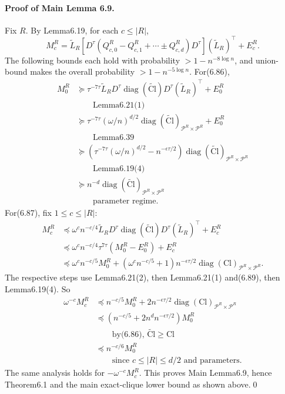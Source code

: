 \paragraph{Proof of Main Lemma 6.9.} Fix $R$. By Lemma6.19, for each $c\le|R|$,
\[M_c^R=\widetilde L_R[D^\tau(Q_{c,0}^R-Q_{c,1}^R+\cdots\pm Q_{c,d}^R)D^\tau](\widetilde L_R)^\top+E_c^R.\tag{6.89}\]
The following bounds each hold with probability $>1-n^{-8\log n}$, and union-bound makes the overall probability $>1-n^{-5\log n}$.
For(6.86),
\begin{align*}M_0^R&\succeq\tau^{-7\tau}\widetilde L_RD^\tau\operatorname{diag}(\widetilde{\mathrm{Cl}})D^\tau(\widetilde L_R)^\top+E_0^R\\&\qquad\text{Lemma6.21(1)}\\&\succeq\tau^{-7\tau}(\omega/n)^{d/2}\operatorname{diag}(\widetilde{\mathrm{Cl}})_{\mathcal P^R\times\mathcal P^R}+E_0^R\\&\qquad\text{Lemma6.39}\\&\succeq(\tau^{-7\tau}(\omega/n)^{d/2}-n^{-\epsilon\tau/2})\operatorname{diag}(\widetilde{\mathrm{Cl}})_{\mathcal P^R\times\mathcal P^R}\\&\qquad\text{Lemma6.19(4)}\\&\succeq n^{-d}\operatorname{diag}(\widetilde{\mathrm{Cl}})_{\mathcal P^R\times\mathcal P^R}\\&\qquad\text{parameter regime}.\end{align*}
For(6.87), fix $1\le c\le|R|$:
\begin{align*}M_c^R&\preceq\omega^cn^{-c/4}\widetilde L_RD^\tau\operatorname{diag}(\widetilde{\mathrm{Cl}})D^\tau(\widetilde L_R)^\top+E_c^R\\&\preceq\omega^cn^{-c/4}\tau^{7\tau}(M_0^R-E_0^R)+E_c^R\\&\preceq\omega^cn^{-c/5}M_0^R+(\omega^cn^{-c/5}+1)n^{-\epsilon\tau/2}\operatorname{diag}(\mathrm{Cl})_{\mathcal P^R\times\mathcal P^R}.\end{align*}
The respective steps use Lemma6.21(2), then Lemma6.21(1) and(6.89), then Lemma6.19(4). So
\begin{align*}\omega^{-c}M_c^R&\preceq n^{-c/5}M_0^R+2n^{-\epsilon\tau/2}\operatorname{diag}(\mathrm{Cl})_{\mathcal P^R\times\mathcal P^R}\\&\preceq(n^{-c/5}+2n^dn^{-\epsilon\tau/2})M_0^R\\&\qquad\text{by(6.86), }\widetilde{\mathrm{Cl}}\ge\mathrm{Cl}\\&\preceq n^{-c/6}M_0^R\\&\qquad\text{since }c\le|R|\le d/2\text{ and parameters}.\end{align*}
The same analysis holds for $-\omega^{-c}M_c^R$. This proves Main Lemma6.9, hence Theorem6.1 and the main exact-clique lower bound as shown above.\qed
